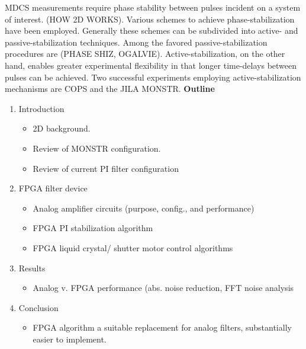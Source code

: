 \documentclass[letterpaper,12pt,amsmath,reprint,aip,jmp,onecolumn]{revtex4-1}
\begin{document}
\indent MDCS measurements require phase stability between pulses incident on a system of interest. (HOW 2D WORKS). Various schemes to achieve phase-stabilization have been employed. Generally these schemes can be subdivided into active- and passive-stabilization techniques. Among the favored passive-stabilization procedures are (PHASE SHIZ, OGALVIE). Active-stabilization, on the other hand, enables greater experimental flexibility in that longer time-delays between pulses can be achieved. Two successful experiments employing active-stabilization mechanisms are COPS and the JILA MONSTR. 
\Large{\textbf{Outline}}\\
\begin{enumerate}
\item Introduction
\begin{itemize}
\item 2D background.
\item Review of MONSTR configuration.
\item Review of current PI filter configuration
\end{itemize}
\item FPGA filter device
\begin{itemize}
\item Analog amplifier circuits (purpose, config., and performance)
\item FPGA PI stabilization algorithm
\item FPGA liquid crystal/ shutter motor control algorithms
\end{itemize}

\item Results
\begin{itemize}
\item Analog v. FPGA performance (abs. noise reduction, FFT noise analysis
\end{itemize}
\item Conclusion
\begin{itemize}
\item FPGA algorithm a suitable replacement for analog filters, substantially easier to implement.
\end{itemize}
\end{enumerate}
\end{document}
